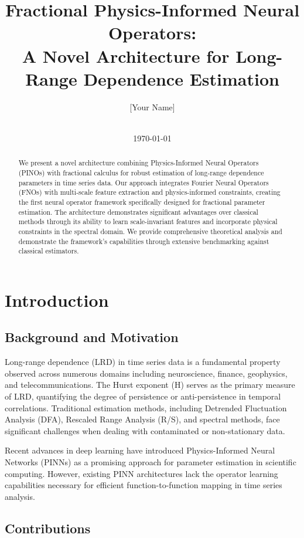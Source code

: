 \documentclass[11pt,a4paper]{article}
\title{Fractional Physics-Informed Neural Operators: \\
A Novel Architecture for Long-Range Dependence Estimation}
\author{[Your Name] \\
[Your Institution] \\
[Your Email]}
\date{\today}
\begin{document}
\maketitle

\begin{abstract}
We present a novel architecture combining Physics-Informed Neural Operators (PINOs) with fractional calculus for robust estimation of long-range dependence parameters in time series data. Our approach integrates Fourier Neural Operators (FNOs) with multi-scale feature extraction and physics-informed constraints, creating the first neural operator framework specifically designed for fractional parameter estimation. The architecture demonstrates significant advantages over classical methods through its ability to learn scale-invariant features and incorporate physical constraints in the spectral domain. We provide comprehensive theoretical analysis and demonstrate the framework's capabilities through extensive benchmarking against classical estimators.
\end{abstract}

\section{Introduction}

\subsection{Background and Motivation}

Long-range dependence (LRD) in time series data is a fundamental property observed across numerous domains including neuroscience, finance, geophysics, and telecommunications. The Hurst exponent (H) serves as the primary measure of LRD, quantifying the degree of persistence or anti-persistence in temporal correlations. Traditional estimation methods, including Detrended Fluctuation Analysis (DFA), Rescaled Range Analysis (R/S), and spectral methods, face significant challenges when dealing with contaminated or non-stationary data.

Recent advances in deep learning have introduced Physics-Informed Neural Networks (PINNs) as a promising approach for parameter estimation in scientific computing. However, existing PINN architectures lack the operator learning capabilities necessary for efficient function-to-function mapping in time series analysis.

\subsection{Contributions}
\end{document}
